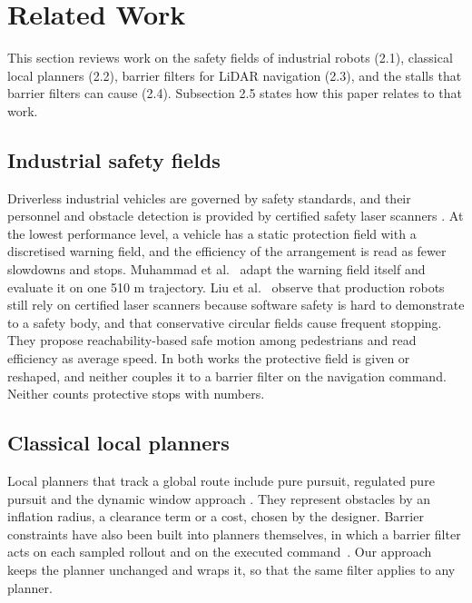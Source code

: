 \section{Related Work}

This section reviews work on the safety fields of industrial robots (2.1), classical local planners (2.2), barrier filters for LiDAR navigation (2.3), and the stalls that barrier filters can cause (2.4). Subsection 2.5 states how this paper relates to that work.

\subsection{Industrial safety fields}

Driverless industrial vehicles are governed by safety standards, and their personnel and obstacle detection is provided by certified safety laser scanners \cite{iso3691-4,iec61496-3} \cite{tiusanen2020}. At the lowest performance level, a vehicle has a static protection field with a discretised warning field, and the efficiency of the arrangement is read as fewer slowdowns and stops. Muhammad et al.~\cite{muhammad2021} adapt the warning field itself and evaluate it on one 510 m trajectory. Liu et al.~\cite{liu2017} observe that production robots still rely on certified laser scanners because software safety is hard to demonstrate to a safety body, and that conservative circular fields cause frequent stopping. They propose reachability-based safe motion among pedestrians and read efficiency as average speed. In both works the protective field is given or reshaped, and neither couples it to a barrier filter on the navigation command. Neither counts protective stops with numbers.

\subsection{Classical local planners}

Local planners that track a global route include pure pursuit, regulated pure pursuit and the dynamic window approach \cite{coulter1992purepursuit,macenski2023rpp,fox1997dwa}. They represent obstacles by an inflation radius, a clearance term or a cost, chosen by the designer. Barrier constraints have also been built into planners themselves, in which a barrier filter acts on each sampled rollout and on the executed command~\cite{coker2026}. Our approach keeps the planner unchanged and wraps it, so that the same filter applies to any planner.

